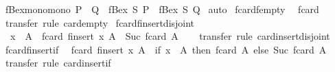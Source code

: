 \begin{isabellebody}
\isamarkupfalse%
\ fBex{\isacharunderscore}mono{\isacharbrackleft}mono{\isacharbrackright}{\isacharcolon}\ {\isachardoublequoteopen}P\ {\isasymle}\ Q\ {\isasymLongrightarrow}\ fBex\ S\ P\ {\isasymle}\ fBex\ S\ Q{\isachardoublequoteclose}\isanewline
%
\isadelimproof
%
\endisadelimproof
%
\isatagproof
{}\isamarkupfalse%
\ auto%
\endisatagproof
{\isafoldproof}%
%
\isadelimproof
\isanewline
%
\endisadelimproof
\isanewline
{}\isamarkupfalse%
%
\isadelimdocument
%
\endisadelimdocument
%
\isatagdocument
%
\isamarkuptrue%
%
\endisatagdocument
{\isafolddocument}%
%
\isadelimdocument
%
\endisadelimdocument
{}\isamarkupfalse%
\ fcard{\isacharunderscore}fempty{\isacharcolon}\isanewline
\ \ {\isachardoublequoteopen}fcard\ {\isacharbraceleft}{\isacharbar}{\isacharbar}{\isacharbraceright}\ {\isacharequal}\ {}{\isachardoublequoteclose}\isanewline
%
\isadelimproof
\ \ %
\endisadelimproof
%
\isatagproof
{}\isamarkupfalse%
\ transfer\ {\isacharparenleft}rule\ card{\isacharunderscore}empty{\isacharparenright}%
\endisatagproof
{\isafoldproof}%
%
\isadelimproof
\isanewline
%
\endisadelimproof
\isanewline
{}\isamarkupfalse%
\ fcard{\isacharunderscore}finsert{\isacharunderscore}disjoint{\isacharcolon}\isanewline
\ \ {\isachardoublequoteopen}x\ {\isacharbar}{\isasymnotin}{\isacharbar}\ A\ {\isasymLongrightarrow}\ fcard\ {\isacharparenleft}finsert\ x\ A{\isacharparenright}\ {\isacharequal}\ Suc\ {\isacharparenleft}fcard\ A{\isacharparenright}{\isachardoublequoteclose}\isanewline
%
\isadelimproof
\ \ %
\endisadelimproof
%
\isatagproof
{}\isamarkupfalse%
\ transfer\ {\isacharparenleft}rule\ card{\isacharunderscore}insert{\isacharunderscore}disjoint{\isacharparenright}%
\endisatagproof
{\isafoldproof}%
%
\isadelimproof
\isanewline
%
\endisadelimproof
\isanewline
{}\isamarkupfalse%
\ fcard{\isacharunderscore}finsert{\isacharunderscore}if{\isacharcolon}\isanewline
\ \ {\isachardoublequoteopen}fcard\ {\isacharparenleft}finsert\ x\ A{\isacharparenright}\ {\isacharequal}\ {\isacharparenleft}if\ x\ {\isacharbar}{\isasymin}{\isacharbar}\ A\ then\ fcard\ A\ else\ Suc\ {\isacharparenleft}fcard\ A{\isacharparenright}{\isacharparenright}{\isachardoublequoteclose}\isanewline
%
\isadelimproof
\ \ %
\endisadelimproof
%
\isatagproof
{}\isamarkupfalse%
\ transfer\ {\isacharparenleft}rule\ card{\isacharunderscore}insert{\isacharunderscore}if{\isacharparenright}%
\endisatagproof
{\isafoldproof}%
%
\isadelimproof
\isanewline

\end{isabellebody}

